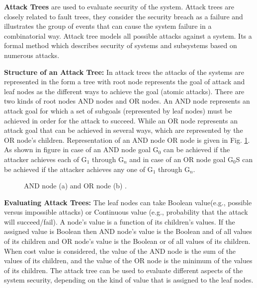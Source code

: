 \documentclass[pdftex,english,oribibl]{llncs}
\begin{document}
\textbf{Attack Trees} are used to evaluate security of the system. Attack trees are closely related to fault trees, they consider the security breach as a failure and illustrates the group of events that can cause the system failure in a combinatorial way. Attack tree models all possible attacks against a system. Its a formal method which describes security of systems and subsystems based on numerous attacks. 

\textbf{Structure of an Attack Tree:} In attack trees the attacks of the systems are represented in the form a tree with root node represents the goal of attack and leaf nodes as the different ways to achieve the goal (atomic attacks). There are two kinds of root nodes AND nodes and OR nodes. An AND node represents an attack goal for which a set of subgoals (represented by leaf nodes) must be achieved in order for the attack to succeed. While an OR node represents an attack goal that can be achieved in several ways, which are represented by the OR node's children. Representation of an AND node OR node is given in Fig. \ref{fig:and_or_node}. As shown in figure in case of an AND node goal G$_0$ can be achieved if the attacker achieves each of G$_1$ through G$_n$ and in case of an OR node goal G$_0$S can be achieved if the attacker achieves any one of G$_1$ through G$_n$. 

\begin{figure}[h]
	\centering
	\caption{AND node (a) and OR node (b) \cite{1335467_Nicol}.}
	\label{fig:and_or_node}
\end{figure}

\textbf{Evaluating Attack Trees:} The leaf nodes can take Boolean value(e.g., possible versus impossible attacks) or Continuous value (e.g., probability that the attack will succeed/fail). A node's value is a function of its children's values. If the assigned value is Boolean then AND node's value is the Boolean and of all values of its children and OR node's value is the Boolean or of all values of its children. When cost value is considered, the value of the AND node is the sum of the values of its children, and the value of the OR node is the minimum of the values of its children. The attack tree can be used to evaluate different aspects of the system security, depending on the kind of value that is assigned to the leaf nodes.
\end{document}
